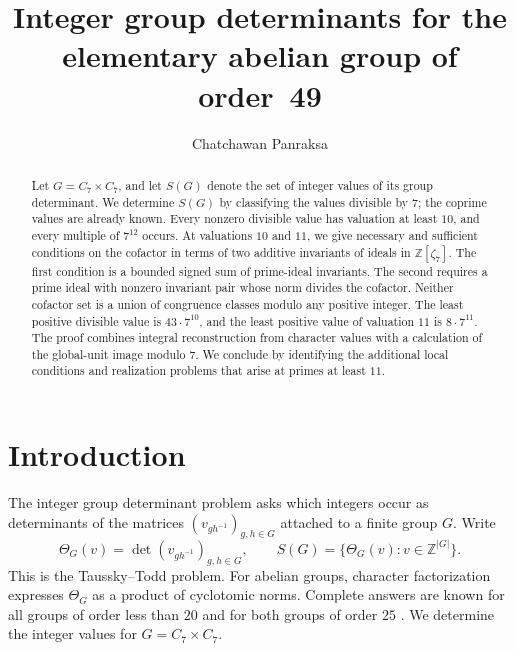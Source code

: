 \documentclass[11pt]{amsart}
\title[Integer group determinants for $C_7\times C_7$]
{Integer group determinants for the elementary abelian group of order~49}
\author{Chatchawan Panraksa}
\date{}
\theoremstyle{plain}
\theoremstyle{definition}
\numberwithin{equation}{section}
\newcommand{\Z}{\mathbb Z}
\begin{document}
\begin{abstract}
Let $G=C_7\times C_7$, and let $S(G)$ denote the set of integer
values of its group determinant. We determine $S(G)$ by classifying
the values divisible by $7$; the coprime values are already known.
Every nonzero divisible value has valuation at least $10$, and every
multiple of $7^{12}$ occurs. At valuations $10$ and $11$, we give
necessary and sufficient conditions on the cofactor in terms of two
additive invariants of ideals in $\mathbb Z[\zeta_7]$. The first
condition is a bounded signed sum of prime-ideal invariants. The
second requires a prime ideal with nonzero invariant pair whose norm
divides the cofactor. Neither cofactor set is a union of congruence
classes modulo any positive integer. The least positive divisible
value is $43\cdot7^{10}$, and the least positive value of valuation
$11$ is $8\cdot7^{11}$. The proof combines integral reconstruction
from character values with a calculation of the global-unit image
modulo $7$. We conclude by identifying the additional local
conditions and realization problems that arise at primes at least $11$.
\end{abstract}
\maketitle
\section{Introduction}\label{sec:intro}

The integer group determinant problem asks which integers occur as
determinants of the matrices $(v_{gh^{-1}})_{g,h\in G}$ attached to a
finite group $G$. Write
\[
 \Theta_G(v)=\det(v_{gh^{-1}})_{g,h\in G},\qquad
 S(G)=\{\Theta_G(v):v\in\Z^{|G|}\}.
\]
This is the Taussky--Todd problem. For abelian groups, character
factorization expresses $\Theta_G$ as a product of cyclotomic norms.
Complete answers are
known for all groups of order less than $20$
\cite{PinnerSmyth2020,PaudelPinner2025Order18} and for both groups
of order $25$ \cite{MossinghoffPinner2022,Panraksa2026}.
We determine the integer values for $G=C_7\times C_7$.
\end{document}
